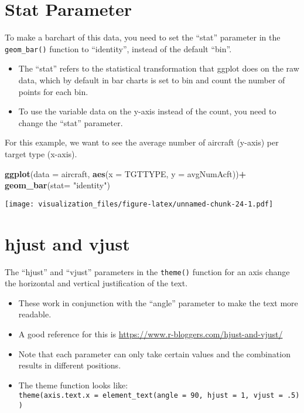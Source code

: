 \documentclass[oneside]{memoir}
\newenvironment{Shaded}{\begin{snugshade}}{\end{snugshade}}
\newcommand{\KeywordTok}[1]{\textcolor[rgb]{0.13,0.29,0.53}{\textbf{#1}}}
\newcommand{\DataTypeTok}[1]{\textcolor[rgb]{0.13,0.29,0.53}{#1}}
\newcommand{\StringTok}[1]{\textcolor[rgb]{0.31,0.60,0.02}{#1}}
\newcommand{\OperatorTok}[1]{\textcolor[rgb]{0.81,0.36,0.00}{\textbf{#1}}}
\newcommand{\NormalTok}[1]{#1}
\theoremstyle{definition}
\theoremstyle{definition}
\theoremstyle{definition}
\theoremstyle{remark}
\begin{document}
\section{Stat Parameter}\label{stat-parameter}

To make a barchart of this data, you need to set the ``stat'' parameter
in the \texttt{geom\_bar()} function to ``identity'', instead of the
default ``bin''.

\begin{itemize}
\item
  The ``stat'' refers to the statistical transformation that ggplot does
  on the raw data, which by default in bar charts is set to bin and
  count the number of points for each bin.
\item
  To use the variable data on the y-axis instead of the count, you need
  to change the ``stat'' parameter.
\end{itemize}

For this example, we want to see the average number of aircraft (y-axis)
per target type (x-axis).

\begin{Shaded}
\begin{Highlighting}[]
\KeywordTok{ggplot}\NormalTok{(}\DataTypeTok{data =}\NormalTok{ aircraft, }\KeywordTok{aes}\NormalTok{(}\DataTypeTok{x =}\NormalTok{ TGTTYPE, }\DataTypeTok{y =}\NormalTok{ avgNumAcft))}\OperatorTok{+}
\StringTok{  }\KeywordTok{geom_bar}\NormalTok{(}\DataTypeTok{stat=} \StringTok{"identity"}\NormalTok{)}
\end{Highlighting}
\end{Shaded}

\texttt{[image: visualization\_files/figure-latex/unnamed-chunk-24-1.pdf]}

\section{hjust and vjust}\label{hjust-and-vjust}

The ``hjust'' and ``vjust'' parameters in the \texttt{theme()} function
for an axis change the horizontal and vertical justification of the
text.

\begin{itemize}
\item
  These work in conjunction with the ``angle'' parameter to make the
  text more readable.
\item
  A good reference for this is
  \url{https://www.r-bloggers.com/hjust-and-vjust/}
\item
  Note that each parameter can only take certain values and the
  combination results in different positions.
\item
  The theme function looks like:
  \texttt{theme(axis.text.x\ =\ element\_text(angle\ =\ 90,\ hjust\ =\ 1,\ vjust\ =\ .5))}
\end{itemize}
\end{document}
